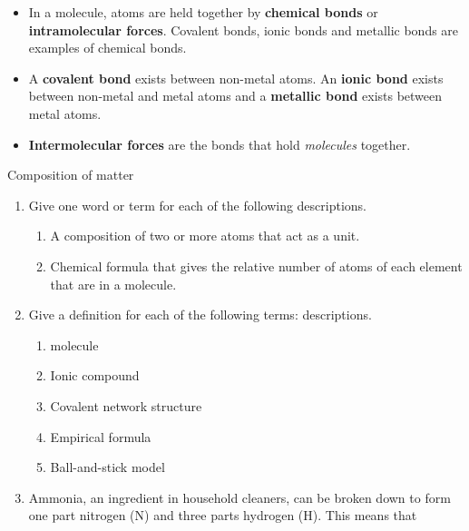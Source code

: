 \begin{itemize}[noitemsep]
{model} is also a 3-dimensional molecular model. The atoms are 
represented by spheres.
\label{m38120*uid77}\item In a molecule, atoms are held together by \textbf{chemical bonds} or \textbf{intramolecular forces}. Covalent bonds, ionic bonds and 
metallic bonds are examples of chemical bonds.
\label{m38120*uid78}\item A \textbf{covalent bond} 
exists between non-metal atoms. An \textbf{ionic bond} 
exists between non-metal and metal atoms and a \textbf{metallic 
bond} exists between metal atoms.
\label{m38120*uid79}\item \textbf{Intermolecular 
forces} are the bonds that hold \textsl{molecules} together.
\end{itemize}
\label{m38120*secfhsst!!!underscore!!!id497}
            \begin{eocexercises}{Composition of matter}
            \nopagebreak
            \label{m38120*id311490}\begin{enumerate}[noitemsep, label=\textbf{\arabic*}. ] 
            \label{m38120*uid87}\item Give one word or term for each of the following 
descriptions.
\label{m38120*id34411506}\begin{enumerate}[noitemsep, label=\textbf{\alph*}. ] 
            \label{m38120*uid90}\item A composition of two or more atoms that act as a unit.
\label{m38120*uid9221}\item Chemical formula that gives the relative number of atoms 
of each element that are in a molecule.
\end{enumerate}
\label{m38120*uid227}\item Give a definition for each of the following terms: 
descriptions.
\label{m38120*id311506}\begin{enumerate}[noitemsep, label=\textbf{\alph*}. ] 
            \label{m38120*uid930}\item molecule
\label{m38120*uid91}\item Ionic compound
\item Covalent network structure\item Empirical formula\item Ball-and-stick model\end{enumerate}
\label{m38120*uid92}\item Ammonia, an ingredient in household cleaners, can be broken down to 
form one part nitrogen ($\mathrm{N}$) and three parts hydrogen ($\mathrm{H}$). This means that 

\end{enumerate}
\end{eocexercises}
